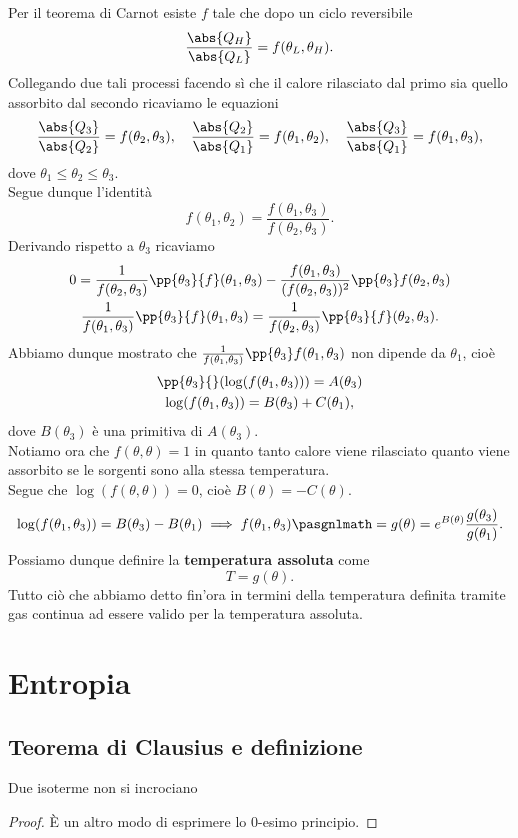 \noindent
Per il teorema di Carnot esiste $f$ tale che dopo un ciclo reversibile
\[\frac{\abs{Q_H}}{\abs{Q_L}}=f(\theta_L,\theta_H).\]
Collegando due tali processi facendo s\`i che il calore rilasciato dal primo sia quello assorbito dal secondo ricaviamo le equazioni
\[\frac{\abs{Q_3}}{\abs{Q_2}}=f(\theta_2,\theta_3),\quad\frac{\abs{Q_2}}{\abs{Q_1}}=f(\theta_1,\theta_2),\quad \frac{\abs{Q_3}}{\abs{Q_1}}=f(\theta_1,\theta_3),\]
dove $\theta_1\leq \theta_2\leq \theta_3$.\\
Segue dunque l'identit\`a
\[f(\theta_1,\theta_2)=\frac{f(\theta_1,\theta_3)}{f(\theta_2,\theta_3)}.\]
Derivando rispetto a $\theta_3$ ricaviamo
\begin{gather*}
0=\frac1{f(\theta_2,\theta_3)}\pp{\theta_3}{f}(\theta_1,\theta_3)-\frac{f(\theta_1,\theta_3)}{(f(\theta_2,\theta_3))^2}\pp{\theta_3}f(\theta_2,\theta_3)\\
\frac1{f(\theta_1,\theta_3)}\pp{\theta_3}{f}(\theta_1,\theta_3)=\frac1{f(\theta_2,\theta_3)}\pp{\theta_3}{f}(\theta_2,\theta_3).
\end{gather*}
Abbiamo dunque mostrato che $\frac1{f(\theta_1,\theta_3)}\pp{\theta_3}f(\theta_1,\theta_3)$ non dipende da $\theta_1$, cio\`e
\begin{gather*}
\pp{\theta_3}{}(\log(f(\theta_1,\theta_3)))=A(\theta_3)\\
\log(f(\theta_1,\theta_3))=B(\theta_3)+C(\theta_1),
\end{gather*}
dove $B(\theta_3)$ \`e una primitiva di $A(\theta_3)$.\\
Notiamo ora che $f(\theta,\theta)=1$ in quanto tanto calore viene rilasciato quanto viene assorbito se le sorgenti sono alla stessa temperatura.\\ 
Segue che $\log(f(\theta,\theta))=0$, cio\`e $B(\theta)=-C(\theta)$.
\[\log(f(\theta_1,\theta_3))=B(\theta_3)-B(\theta_1)\implies f(\theta_1,\theta_3)\pasgnlmath={g(\theta)=e^{B(\theta)}}\frac{g(\theta_3)}{g(\theta_1)}.\]
Possiamo dunque definire la \textbf{temperatura assoluta} come
\[T=g(\theta).\]
Tutto ci\`o che abbiamo detto fin'ora in termini della temperatura definita tramite gas continua ad essere valido per la temperatura assoluta.

\section{Entropia}
\subsection{Teorema di Clausius e definizione}
\begin{lemma}\label{IsotermeFibrano}
Due isoterme non si incrociano
\end{lemma}
\begin{proof}
\`E un altro modo di esprimere lo 0-esimo principio.
\end{proof}

